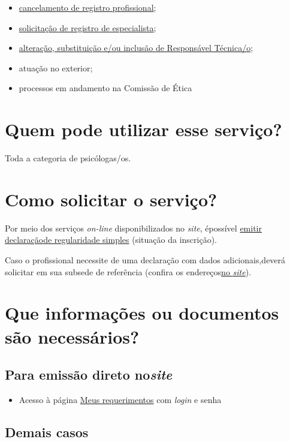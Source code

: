 \begin{itemize}
  \item  \hyperref[]{cancelamento de  registro profissional};
  \item  \hyperref[]{solicitação  de registro de especialista};
  \item  \hyperref[]{alteração,  substituição e/ou inclusão de Responsável Técnica/o};
  \item  atuação no exterior;
  \item  processos em andamento na Comissão de Ética
\end{itemize}

\section{Quem pode utilizar esse serviço?}

Toda a categoria de psicólogas/os.

\section{Como solicitar o serviço?}

Por meio dos serviços \emph{on-line} disponibilizados no \emph{site}, épossível \href{https://www.crpsp.org/pagina/view/326}{emitir declaraçãode regularidade simples} (situação da inscrição).

Caso o profissional necessite de uma declaração com dados adicionais,deverá solicitar em sua subsede de referência (confira os endereços\href{https://www.crpsp.org/sede/index}{no \emph{site}}).

\section{Que informações ou documentos são necessários?}

\subsection{Para emissão direto no\emph{site}}

\begin{itemize}
  \item  Acesso à página  \href{https://cfpsp.brctotal.com/crp06_servicosonline/pgsRequerimento/Requerimentos.aspx}{Meus  requerimentos} com \emph{login} e senha
\end{itemize}

\subsection{Demais casos}

